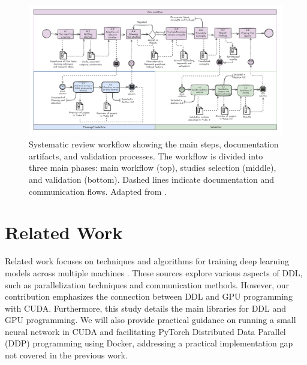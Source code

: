 
\begin{figure}[th]
	\centering
	\includegraphics[width=\linewidth]{figures/workflow2}
	\caption{Systematic review workflow showing the main steps, documentation artifacts, and validation processes.
		The workflow is divided into three main phases: main workflow (top), studies selection (middle), and
		validation (bottom). Dashed lines indicate documentation and communication flows. Adapted from \cite{dos_santos_sustainable_2024}.}
	\label{fig:workflow}
\end{figure}

\section{Related Work}
\label{sec:related_work}


Related work focuses on techniques and algorithms for training deep learning models across multiple
machines \cite{dehghani_distributed_2023, chahal_hitchhikers_2018, berloco_systematic_2022}. These
sources explore various aspects of DDL, such as parallelization techniques and communication
methods. However, our contribution emphasizes the connection between DDL and GPU programming with
CUDA. Furthermore, this study details the main libraries for DDL and GPU programming. We will also
provide practical guidance on running a small neural network in CUDA and facilitating PyTorch
Distributed Data Parallel (DDP) programming using Docker, addressing a practical implementation gap
not covered in the previous work. 

